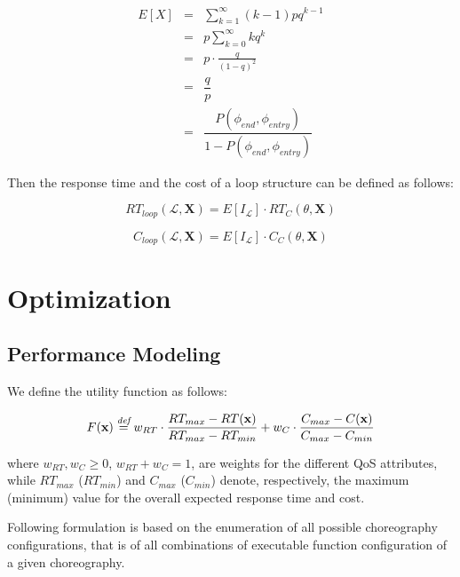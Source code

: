 \begin{eqnarray}
	E[X] & = & \sum_{k = 1}^\infty (k-1) pq^{k-1} \nonumber \\
	& = & p \sum_{k = 0}^\infty kq^{k} \nonumber \\
	& = & p \cdot \frac{q}{(1-q)^2} \nonumber \\
	& = & \dfrac{q}{p} \nonumber \\
	& = & \dfrac{P(\phi_{end}, \phi_{entry})}{1 - P(\phi_{end}, \phi_{entry})} 
\end{eqnarray}

Then the response time and the cost of a loop structure can be defined as follows:

\begin{equation}
	RT_{loop}(\mathcal{L}, \textbf{X}) = E[I_{\mathcal{L}}] \cdot RT_C(\theta, \textbf{X})
\end{equation}

\begin{equation}
	C_{loop}(\mathcal{L}, \textbf{X}) = E[I_{\mathcal{L}}] \cdot C_C(\theta, \textbf{X})
\end{equation}


\section{Optimization}


\subsection{Performance Modeling}






We define the utility function as follows:

\begin{equation}
	F(\textbf{x}) \overset{\textit{def}}{=} w_{RT} \cdot \dfrac{RT_{max} - RT(\textbf{x})}{RT_{max} - RT_{min}} + w_{C} \cdot \dfrac{C_{max} - C(\textbf{x})}{C_{max} - C_{min}}
\end{equation}

where $w_{RT}, w_{C} \geq 0$, $w_{RT} + w_{C} = 1$, are weights for the different QoS attributes, while $RT_{max}$ ($RT_{min}$) and $C_{max}$ ($C_{min}$) denote, respectively, the maximum (minimum) value for the overall expected response time and cost.


Following formulation is based on the enumeration of all possible choreography configurations, that is of all combinations of executable function configuration of a given choreography.

